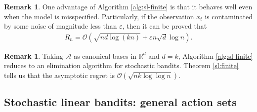 \documentclass[10pt,a4paper]{amsart}
\numberwithin{equation}{section}
\theoremstyle{plain}
\theoremstyle{definition}
\newtheorem{Rem}[Th]{Remark}
\def\R{{\mathbb R}}
\def\R{{\mathbb R}}
\def\e{{\varepsilon}}
\begin{document}
\begin{Rem}
One advantage of Algorithm \ref{alg:sl-finite} is that it behaves well even when the model is misspecified. Particularly, if the observation $x_t$ is contaminated by some noise of magnitude less than $\e$, then it can be proved that 
\begin{align*}
R_n=\mathcal O\left(\sqrt{nd\log (kn)}+\e n\sqrt{d}\log n\right). 
\end{align*}
\end{Rem}

\begin{Rem}
Taking $\mathcal A$ as canonical bases in $\R^d$ and $d=k$,  Algorithm \ref{alg:sl-finite} reduces to an elimination algorithm for stochastic bandits. Theorem \ref{sl:finite} tells us that the asymptotic regret is $\mathcal O(\sqrt{nk\log\log n})$.   
\end{Rem}

\subsection{Stochastic linear bandits: general action sets}











 
\printbibliography
 
 
\end{document}
